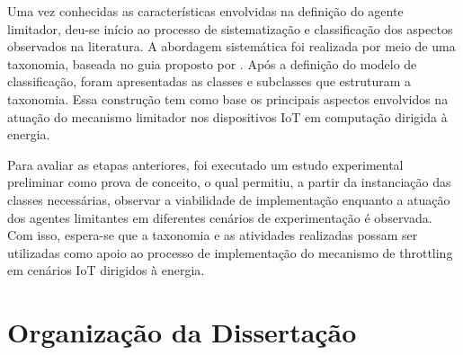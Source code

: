 Uma vez conhecidas as características envolvidas na definição do agente limitador, deu-se início ao processo de sistematização e classificação dos aspectos observados na literatura. A abordagem sistemática foi realizada por meio de uma taxonomia, baseada no guia proposto por . Após a definição do modelo de classificação, foram apresentadas as classes e subclasses que estruturam a taxonomia. Essa construção tem como base os principais aspectos envolvidos na atuação do mecanismo limitador nos dispositivos \acs{IoT} em computação dirigida à energia.


Para avaliar as etapas anteriores, foi executado um estudo experimental preliminar como prova de conceito, o qual permitiu, a partir da instanciação das classes necessárias, observar a viabilidade de implementação enquanto a atuação dos agentes limitantes em diferentes cenários de experimentação é observada. Com isso, espera-se que a taxonomia e as atividades realizadas possam ser utilizadas como apoio ao processo de implementação do mecanismo de throttling em cenários \acs{IoT} dirigidos à energia.


\section{Organização da Dissertação }


